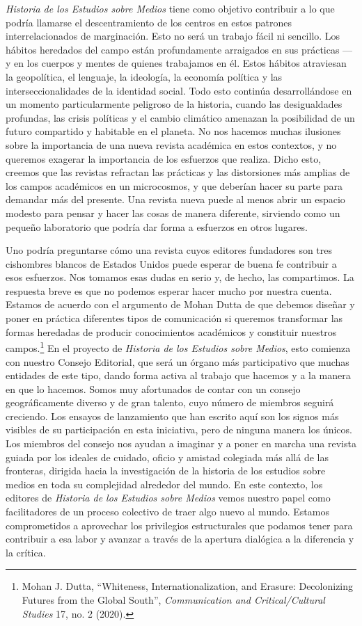 \documentclass{tufte-handout}
\begin{document}
\emph{Historia de los Estudios sobre Medios} tiene como objetivo
contribuir a lo que podría llamarse el descentramiento de los centros en
estos patrones interrelacionados de marginación. Esto no será un trabajo
fácil ni sencillo. Los hábitos heredados del campo están profundamente
arraigados en sus prácticas ---y en los cuerpos y mentes de quienes
trabajamos en él. Estos hábitos atraviesan la geopolítica, el lenguaje,
la ideología, la economía política y las interseccionalidades de la
identidad social. Todo esto continúa desarrollándose en un momento
particularmente peligroso de la historia, cuando las desigualdades
profundas, las crisis políticas y el cambio climático amenazan la
posibilidad de un futuro compartido y habitable en el planeta. No nos
hacemos muchas ilusiones sobre la importancia de una nueva revista
académica en estos contextos, y no queremos exagerar la importancia de
los esfuerzos que realiza. Dicho esto, creemos que las revistas
refractan las prácticas y las distorsiones más amplias de los campos
académicos en un microcosmos, y que deberían hacer su parte para
demandar más del presente. Una revista nueva puede al menos abrir un
espacio modesto para pensar y hacer las cosas de manera diferente,
sirviendo como un pequeño laboratorio que podría dar forma a esfuerzos
en otros lugares.

Uno podría preguntarse cómo una revista cuyos editores fundadores son
tres cishombres blancos de Estados Unidos puede esperar de buena fe
contribuir a esos esfuerzos. Nos tomamos esas dudas en serio y, de
hecho, las compartimos. La respuesta breve es que no podemos esperar
hacer mucho por nuestra cuenta. Estamos de acuerdo con el argumento de
Mohan Dutta de que debemos diseñar y poner en práctica diferentes tipos
de comunicación si queremos transformar las formas heredadas de producir
conocimientos académicos y constituir nuestros campos.\footnote{Mohan J.
  Dutta, ``Whiteness, Internationalization, and Erasure: Decolonizing
  Futures from the Global South'', \emph{Communication and
  Critical/Cultural Studies} 17, no. 2 (2020).} En el proyecto de
\emph{Historia de los Estudios sobre Medios}, esto comienza con nuestro
Consejo Editorial, que será un órgano más participativo que muchas
entidades de este tipo, dando forma activa al trabajo que hacemos y a la
manera en que lo hacemos. Somos muy afortunados de contar con un consejo
geográficamente diverso y de gran talento, cuyo número de miembros
seguirá creciendo. Los ensayos de lanzamiento que han escrito aquí son
los signos más visibles de su participación en esta iniciativa, pero de
ninguna manera los únicos. Los miembros del consejo nos ayudan a
imaginar y a poner en marcha una revista guiada por los ideales de
cuidado, oficio y amistad colegiada más allá de las fronteras, dirigida
hacia la investigación de la historia de los estudios sobre medios en
toda su complejidad alrededor del mundo. En este contexto, los editores
de \emph{Historia de los Estudios sobre Medios} vemos nuestro papel como
facilitadores de un proceso colectivo de traer algo nuevo al mundo.
Estamos comprometidos a aprovechar los privilegios estructurales que
podamos tener para contribuir a esa labor y avanzar a través de la
apertura dialógica a la diferencia y la crítica.
\end{document}
